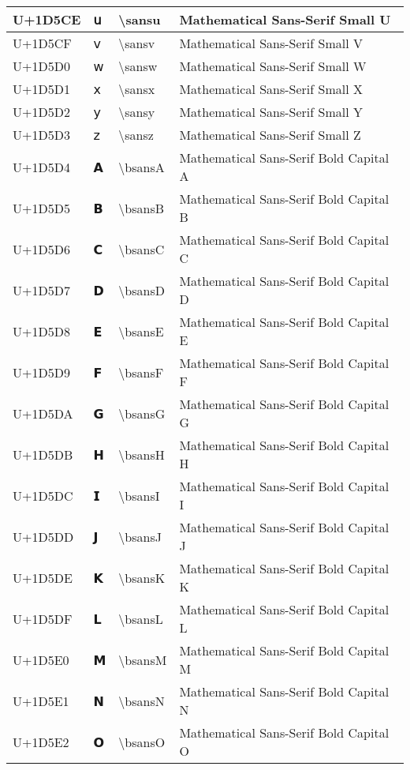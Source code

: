 \begin{table}[h]
\begin{tabulary}{\linewidth}{|L|L|L|L|}
\hline
U+1D5CE & 𝗎 & {\textbackslash}sansu & Mathematical Sans-Serif Small U \\
\hline
U+1D5CF & 𝗏 & {\textbackslash}sansv & Mathematical Sans-Serif Small V \\
\hline
U+1D5D0 & 𝗐 & {\textbackslash}sansw & Mathematical Sans-Serif Small W \\
\hline
U+1D5D1 & 𝗑 & {\textbackslash}sansx & Mathematical Sans-Serif Small X \\
\hline
U+1D5D2 & 𝗒 & {\textbackslash}sansy & Mathematical Sans-Serif Small Y \\
\hline
U+1D5D3 & 𝗓 & {\textbackslash}sansz & Mathematical Sans-Serif Small Z \\
\hline
U+1D5D4 & 𝗔 & {\textbackslash}bsansA & Mathematical Sans-Serif Bold Capital A \\
\hline
U+1D5D5 & 𝗕 & {\textbackslash}bsansB & Mathematical Sans-Serif Bold Capital B \\
\hline
U+1D5D6 & 𝗖 & {\textbackslash}bsansC & Mathematical Sans-Serif Bold Capital C \\
\hline
U+1D5D7 & 𝗗 & {\textbackslash}bsansD & Mathematical Sans-Serif Bold Capital D \\
\hline
U+1D5D8 & 𝗘 & {\textbackslash}bsansE & Mathematical Sans-Serif Bold Capital E \\
\hline
U+1D5D9 & 𝗙 & {\textbackslash}bsansF & Mathematical Sans-Serif Bold Capital F \\
\hline
U+1D5DA & 𝗚 & {\textbackslash}bsansG & Mathematical Sans-Serif Bold Capital G \\
\hline
U+1D5DB & 𝗛 & {\textbackslash}bsansH & Mathematical Sans-Serif Bold Capital H \\
\hline
U+1D5DC & 𝗜 & {\textbackslash}bsansI & Mathematical Sans-Serif Bold Capital I \\
\hline
U+1D5DD & 𝗝 & {\textbackslash}bsansJ & Mathematical Sans-Serif Bold Capital J \\
\hline
U+1D5DE & 𝗞 & {\textbackslash}bsansK & Mathematical Sans-Serif Bold Capital K \\
\hline
U+1D5DF & 𝗟 & {\textbackslash}bsansL & Mathematical Sans-Serif Bold Capital L \\
\hline
U+1D5E0 & 𝗠 & {\textbackslash}bsansM & Mathematical Sans-Serif Bold Capital M \\
\hline
U+1D5E1 & 𝗡 & {\textbackslash}bsansN & Mathematical Sans-Serif Bold Capital N \\
\hline
U+1D5E2 & 𝗢 & {\textbackslash}bsansO & Mathematical Sans-Serif Bold Capital O \\

\end{tabulary}
\end{table}
